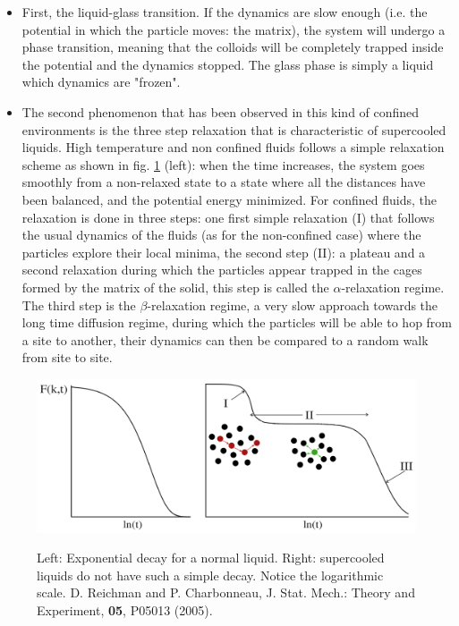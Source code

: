 \documentclass[a4paper,12pt]{article}
\newcommand{\jline}{\vspace{10pt}}
\begin{document}
\begin{itemize}

\item First, the liquid-glass transition. If the dynamics are slow enough (i.e. the potential in which the particle moves: the matrix), 
the system will undergo a phase transition, meaning that the colloids will be completely trapped inside the potential and the dynamics 
stopped. The glass phase is simply a liquid which dynamics are "frozen".\jline

\item The second phenomenon that has been observed in this kind of confined environments is the three step relaxation that is 
characteristic of supercooled liquids. High temperature and non confined fluids follows a simple relaxation scheme as shown in fig. 
\ref{relaxations} (left): when the time increases, the system goes smoothly from a non-relaxed state to a state where all the distances
have been balanced, and the potential energy minimized. For confined fluids, the relaxation is done in three steps: one first simple 
relaxation (I) that follows the usual dynamics of the fluids (as for the non-confined case) where the particles explore their local minima,
the second step (II): a plateau and a second relaxation during which the particles appear trapped in the cages formed by the matrix of the 
solid, this step is called the $\alpha$-relaxation regime. The third step is the $\beta$-relaxation regime, a very slow approach towards the
long time diffusion regime, during which the particles will be able to hop from a site to another, their dynamics can then be compared to a 
random walk from site to site.\jline
\end{itemize}

\begin{figure}[htbp]
\centering
\subfigure
{\includegraphics[width=14cm]{pics/relaxations.png}}
\caption{Left: Exponential decay for a normal liquid. Right: supercooled liquids do not have such a simple decay. Notice the logarithmic 
scale. D. Reichman and P. Charbonneau, J. Stat. Mech.: Theory and Experiment, \textbf{05}, P05013 (2005).}
\label{relaxations}
\end{figure}
\end{document}
